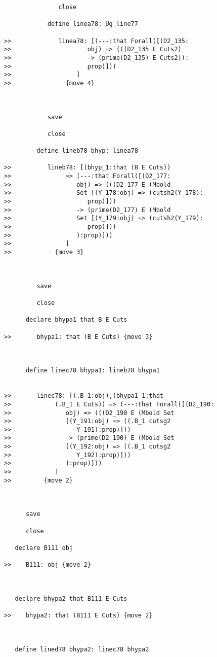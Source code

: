 \documentclass[12pt]{article}
\begin{document}
\begin{verbatim}
               close

            define linea78: Ug line77

>>             linea78: [(---:that Forall([(D2_135:
>>                     obj) => (((D2_135 E Cuts2)
>>                     -> (prime(D2_135) E Cuts2)):
>>                     prop)]))
>>                  ]
>>               {move 4}



            save

            close

         define lineb78 bhyp: linea78

>>          lineb78: [(bhyp_1:that (B E Cuts))
>>               => (---:that Forall([(D2_177:
>>                  obj) => (((D2_177 E (Mbold
>>                  Set [(Y_178:obj) => (cutsh2(Y_178):
>>                     prop)]))
>>                  -> (prime(D2_177) E (Mbold
>>                  Set [(Y_179:obj) => (cutsh2(Y_179):
>>                     prop)]))
>>                  ):prop)]))
>>               ]
>>            {move 3}



         save

         close

      declare bhypa1 that B E Cuts

>>       bhypa1: that (B E Cuts) {move 3}



      define linec78 bhypa1: lineb78 bhypa1


>>       linec78: [(.B_1:obj),(bhypa1_1:that
>>            (.B_1 E Cuts)) => (---:that Forall([(D2_190:
>>               obj) => (((D2_190 E (Mbold Set
>>               [(Y_191:obj) => ((.B_1 cutsg2
>>                  Y_191):prop)]))
>>               -> (prime(D2_190) E (Mbold Set
>>               [(Y_192:obj) => ((.B_1 cutsg2
>>                  Y_192):prop)]))
>>               ):prop)]))
>>            ]
>>         {move 2}



      save

      close

   declare B111 obj

>>    B111: obj {move 2}



   declare bhypa2 that B111 E Cuts

>>    bhypa2: that (B111 E Cuts) {move 2}



   define lined78 bhypa2: linec78 bhypa2



\end{verbatim}
\end{document}
